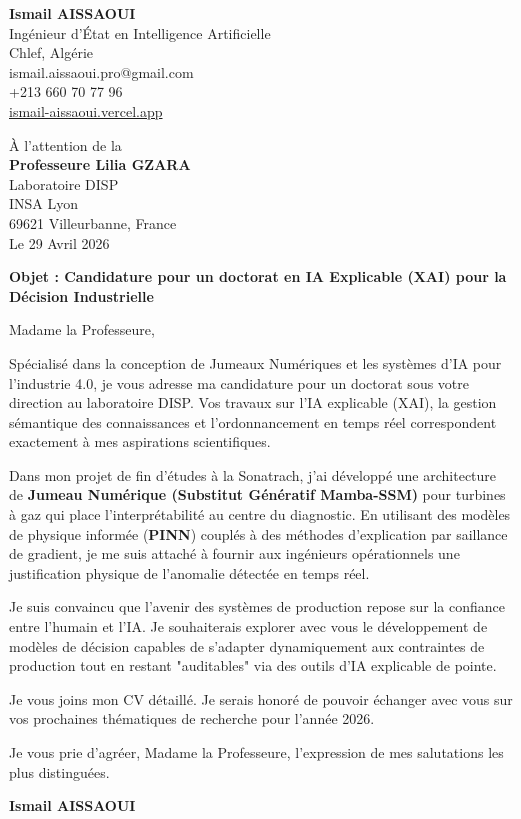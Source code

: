 \documentclass[a4paper,12pt]{article}
\begin{document}
\begin{flushleft}
    \textbf{Ismail AISSAOUI} \\
    Ingénieur d'État en Intelligence Artificielle \\
    Chlef, Algérie \\
    ismail.aissaoui.pro@gmail.com \\
    +213 660 70 77 96 \\
    \href{https://ismail-aissaoui.vercel.app}{ismail-aissaoui.vercel.app}
\end{flushleft}

\begin{flushright}
    À l'attention de la \\
    \textbf{Professeure Lilia GZARA} \\
    Laboratoire DISP \\
    INSA Lyon \\
    69621 Villeurbanne, France \\
    \medskip
    Le 29 Avril 2026
\end{flushright}

\bigskip

\noindent \textbf{Objet : Candidature pour un doctorat en IA Explicable (XAI) pour la Décision Industrielle}

\bigskip

Madame la Professeure,

Spécialisé dans la conception de Jumeaux Numériques et les systèmes d'IA pour l'industrie 4.0, je vous adresse ma candidature pour un doctorat sous votre direction au laboratoire DISP. Vos travaux sur l'IA explicable (XAI), la gestion sémantique des connaissances et l'ordonnancement en temps réel correspondent exactement à mes aspirations scientifiques.

Dans mon projet de fin d'études à la Sonatrach, j'ai développé une architecture de \textbf{Jumeau Numérique (Substitut Génératif Mamba-SSM)} pour turbines à gaz qui place l'interprétabilité au centre du diagnostic. En utilisant des modèles de physique informée (\textbf{PINN}) couplés à des méthodes d'explication par saillance de gradient, je me suis attaché à fournir aux ingénieurs opérationnels une justification physique de l'anomalie détectée en temps réel.

Je suis convaincu que l'avenir des systèmes de production repose sur la confiance entre l'humain et l'IA. Je souhaiterais explorer avec vous le développement de modèles de décision capables de s'adapter dynamiquement aux contraintes de production tout en restant "auditables" via des outils d'IA explicable de pointe.

Je vous joins mon CV détaillé. Je serais honoré de pouvoir échanger avec vous sur vos prochaines thématiques de recherche pour l'année 2026.

Je vous prie d'agréer, Madame la Professeure, l'expression de mes salutations les plus distinguées.

\bigskip

\begin{flushright}
    \textbf{Ismail AISSAOUI}
\end{flushright}
\end{document}
